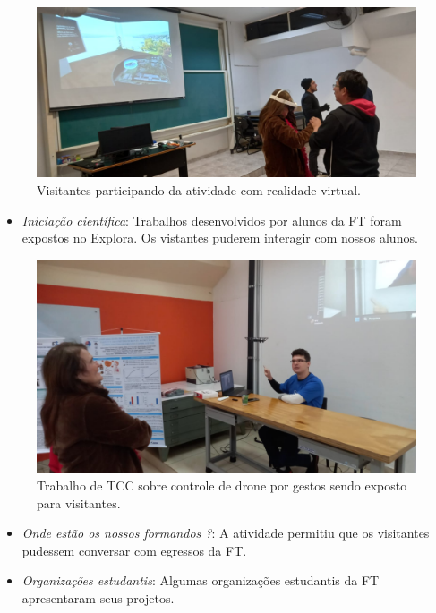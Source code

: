 \documentclass[
  letterpaper,
  DIV=11,
  numbers=noendperiod]{scrreprt}
\providecommand{\tightlist}{%
  \setlength{\itemsep}{0pt}\setlength{\parskip}{0pt}}\usepackage{longtable,booktabs,array}
\begin{document}
\begin{figure}[H]

{\centering \includegraphics[width=0.8\linewidth,height=\textheight,keepaspectratio]{planejamento/RV-2.jpeg}

}

\caption{Visitantes participando da atividade com realidade virtual.}

\end{figure}%

\begin{itemize}
\tightlist
\item
  \emph{Iniciação científica}: Trabalhos desenvolvidos por alunos da FT
  foram expostos no Explora. Os vistantes puderem interagir com nossos
  alunos.
\end{itemize}

\begin{figure}[H]

{\centering \includegraphics[width=0.8\linewidth,height=\textheight,keepaspectratio]{planejamento/IC-1.jpeg}

}

\caption{Trabalho de TCC sobre controle de drone por gestos sendo
exposto para visitantes.}

\end{figure}%

\begin{itemize}
\item
  \emph{Onde estão os nossos formandos ?}: A atividade permitiu que os
  visitantes pudessem conversar com egressos da FT.
\item
  \emph{Organizações estudantis}: Algumas organizações estudantis da FT
  apresentaram seus projetos.
\end{itemize}
\end{document}
